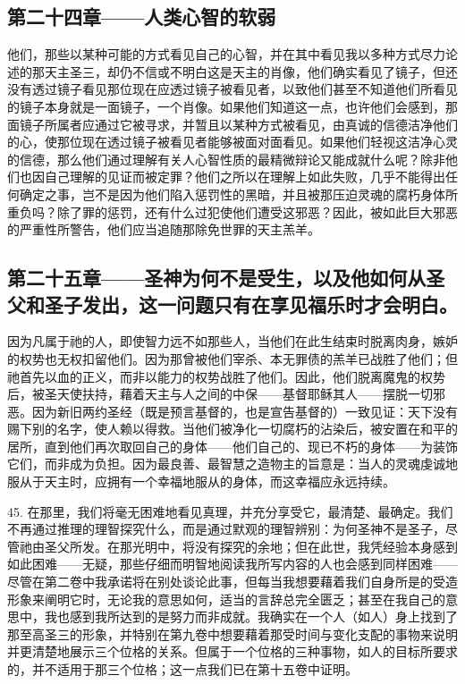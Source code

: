 
\subsection{第二十四章——人类心智的软弱}

他们，那些以某种可能的方式看见自己的心智，并在其中看见我以多种方式尽力论述的那天主圣三，却仍不信或不明白这是天主的肖像，他们确实看见了镜子，但还没有透过镜子看见那位现在应透过镜子被看见者，以致他们甚至不知道他们所看见的镜子本身就是一面镜子，一个肖像。如果他们知道这一点，也许他们会感到，那面镜子所属者应通过它被寻求，并暂且以某种方式被看见，由真诚的信德洁净他们的心，使那位现在透过镜子被看见者能够被面对面看见。如果他们轻视这洁净心灵的信德，那么他们通过理解有关人心智性质的最精微辩论又能成就什么呢？除非他们也因自己理解的见证而被定罪？他们之所以在理解上如此失败，几乎不能得出任何确定之事，岂不是因为他们陷入惩罚性的黑暗，并且被那压迫灵魂的腐朽身体所重负吗？除了罪的惩罚，还有什么过犯使他们遭受这邪恶？因此，被如此巨大邪恶的严重性所警告，他们应当追随那除免世罪的天主羔羊。\par


\subsection{第二十五章——圣神为何不是受生，以及他如何从圣父和圣子发出，这一问题只有在享见福乐时才会明白。}

因为凡属于祂的人，即使智力远不如那些人，当他们在此生结束时脱离肉身，嫉妒的权势也无权扣留他们。因为那曾被他们宰杀、本无罪债的羔羊已战胜了他们；但祂首先以血的正义，而非以能力的权势战胜了他们。因此，他们脱离魔鬼的权势后，被圣天使扶持，藉着天主与人之间的中保——基督耶稣其人——摆脱一切邪恶。因为新旧两约圣经（既是预言基督的，也是宣告基督的）一致见证：天下没有赐下别的名字，使人赖以得救。当他们被净化一切腐朽的沾染后，被安置在和平的居所，直到他们再次取回自己的身体——他们自己的、现已不朽的身体——为装饰它们，而非成为负担。因为最良善、最智慧之造物主的旨意是：当人的灵魂虔诚地服从于天主时，应拥有一个幸福地服从的身体，而这幸福应永远持续。\par

45. 在那里，我们将毫无困难地看见真理，并充分享受它，最清楚、最确定。我们不再通过推理的理智探究什么，而是通过默观的理智辨别：为何圣神不是圣子，尽管祂由圣父所发。在那光明中，将没有探究的余地；但在此世，我凭经验本身感到如此困难——无疑，那些仔细而明智地阅读我所写内容的人也会感到同样困难——尽管在第二卷中我承诺将在别处谈论此事，但每当我想要藉着我们自身所是的受造形象来阐明它时，无论我的意思如何，适当的言辞总完全匮乏；甚至在我自己的意思中，我也感到我所达到的是努力而非成就。我确实在一个人（如人）身上找到了那至高圣三的形象，并特别在第九卷中想要藉着那受时间与变化支配的事物来说明并更清楚地展示三个位格的关系。但属于一个位格的三种事物，如人的目标所要求的，并不适用于那三个位格；这一点我们已在第十五卷中证明。\par

